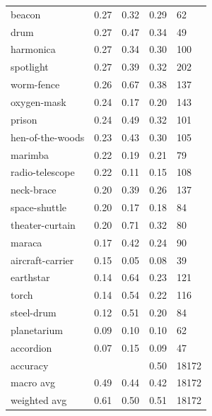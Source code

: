 \begin{center}
\begin{longtable}{lllll}
beacon & 0.27 & 0.32 & 0.29 & 62 \\
drum & 0.27 & 0.47 & 0.34 & 49 \\
harmonica & 0.27 & 0.34 & 0.30 & 100 \\
spotlight & 0.27 & 0.39 & 0.32 & 202 \\
worm-fence & 0.26 & 0.67 & 0.38 & 137 \\
oxygen-mask & 0.24 & 0.17 & 0.20 & 143 \\
prison & 0.24 & 0.49 & 0.32 & 101 \\
hen-of-the-woods & 0.23 & 0.43 & 0.30 & 105 \\
marimba & 0.22 & 0.19 & 0.21 & 79 \\
radio-telescope & 0.22 & 0.11 & 0.15 & 108 \\
neck-brace & 0.20 & 0.39 & 0.26 & 137 \\
space-shuttle & 0.20 & 0.17 & 0.18 & 84 \\
theater-curtain & 0.20 & 0.71 & 0.32 & 80 \\
maraca & 0.17 & 0.42 & 0.24 & 90 \\
aircraft-carrier & 0.15 & 0.05 & 0.08 & 39 \\
earthstar & 0.14 & 0.64 & 0.23 & 121 \\
torch & 0.14 & 0.54 & 0.22 & 116 \\
steel-drum & 0.12 & 0.51 & 0.20 & 84 \\
planetarium & 0.09 & 0.10 & 0.10 & 62 \\
accordion & 0.07 & 0.15 & 0.09 & 47 \\
\midrule
accuracy &  &  & 0.50 & 18172 \\
macro avg & 0.49 & 0.44 & 0.42 & 18172 \\
weighted avg & 0.61 & 0.50 & 0.51 & 18172 \\
\bottomrule
\end{longtable}
\end{center}

